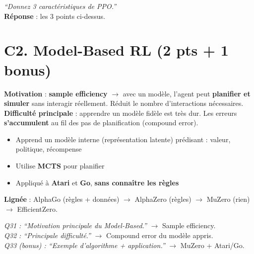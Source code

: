 \documentclass[11pt,a4paper]{article}
\begin{document}
\begin{exambox}
\textit{``Donnez 3 caractéristiques de PPO.''}\\[4pt]
\textbf{Réponse} : les 3 points ci-dessus.
\end{exambox}

\section{C2. Model-Based RL (2 pts + 1 bonus)}

\begin{formbox}
\textbf{Motivation} : \textbf{sample efficiency} $\to$ avec un modèle, l'agent peut \textbf{planifier et simuler} sans interagir réellement. Réduit le nombre d'interactions nécessaires.\\[4pt]
\textbf{Difficulté principale} : apprendre un modèle fidèle est très dur. Les erreurs \textbf{s'accumulent} au fil des pas de planification (compound error).
\end{formbox}

\begin{formbox}
\begin{itemize}[nosep]
\item Apprend un modèle interne (représentation latente) prédisant : valeur, politique, récompense
\item Utilise \textbf{MCTS} pour planifier
\item Appliqué à \textbf{Atari} et \textbf{Go}, \textbf{sans connaître les règles}
\end{itemize}
\textbf{Lignée} : AlphaGo (règles + données) $\to$ AlphaZero (règles) $\to$ MuZero (rien) $\to$ EfficientZero.
\end{formbox}

\begin{exambox}
\textit{Q31 : ``Motivation principale du Model-Based.''} $\to$ Sample efficiency.\\
\textit{Q32 : ``Principale difficulté.''} $\to$ Compound error du modèle appris.\\
\textit{Q33 (bonus) : ``Exemple d'algorithme + application.''} $\to$ MuZero + Atari/Go.
\end{exambox}

\end{document}
